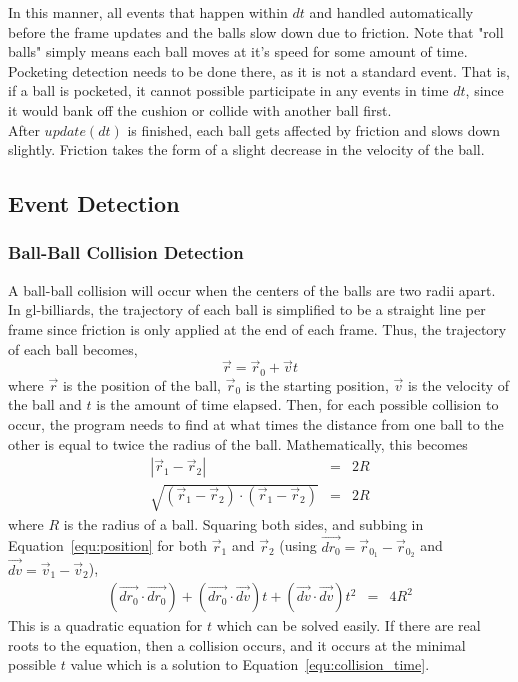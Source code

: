     In this manner, all events that happen within $dt$ and handled automatically before the frame updates and the balls slow
    down due to friction. Note that "roll balls" simply means each ball moves at it's speed for some amount of time. Pocketing
    detection needs to be done there, as it is not a standard event. That is, if a ball is pocketed, it cannot possible participate
    in any events in time $dt$, since it would bank off the cushion or collide with another ball first. \\
    After $update(dt)$ is finished, each ball gets affected by friction and slows down slightly. Friction takes the form of a
    slight decrease in the velocity of the ball. 
    
    \subsection{Event Detection}
        \subsubsection{Ball-Ball Collision Detection}
        A ball-ball collision will occur when the centers of the balls are two radii apart. In gl-billiards, the trajectory
        of each ball is simplified to be a straight line per frame since friction is only applied at the end of each frame.
        Thus, the trajectory of each ball becomes,
        \begin{equation}
            \vec r = \vec r_0 + \vec v t
            \label{equ:position}
        \end{equation}
        where $\vec r$ is the position of the ball, $\vec r_0$ is the starting position, $\vec v$ is the velocity of the ball and
        $t$ is the amount of time elapsed. Then, for each possible collision to occur, the program needs to find at what times the
        distance from one ball to the other is equal to twice the radius of the ball. Mathematically, this becomes
        \begin{eqnarray}
            | \vec r_1 - \vec r_2 | &=& 2 R   \nonumber   \\
            \sqrt{ (\vec r_1 - \vec r_2) \cdot (\vec r_1 - \vec r_2) } &=& 2 R  \nonumber
        \end{eqnarray}
        where $R$ is the radius of a ball. Squaring both sides, and subbing in Equation~\ref{equ:position} for both
        $\vec r_1$ and $\vec r_2$ (using $\vec{dr_0} = \vec r_{0_1} - \vec r_{0_2}$ and $\vec{dv} = \vec v_1 - \vec v_2$),
        \begin{eqnarray}
            (\vec{dr_0} \cdot \vec{dr_0}) + (\vec{dr_0} \cdot \vec{dv}) t + (\vec{dv} \cdot \vec{dv}) t^2 &=& 4 R^2
            \label{equ:collision_time}
        \end{eqnarray}
        This is a quadratic equation for $t$ which can be solved easily. If there are real roots to the equation, then
        a collision occurs, and it occurs at the minimal possible $t$ value which is a solution to Equation~\ref{equ:collision_time}.
        
